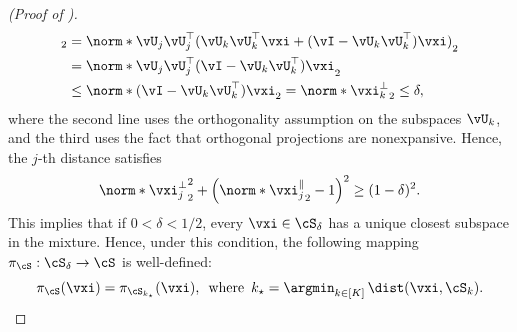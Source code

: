 \documentclass[../../book-main.tex]{subfiles}
\begin{document}
\begin{proof}[(Proof of )]
\begin{align}
{        }_2
        &=
        \norm*{
            \vU_j \vU_j^\top( \vU_k \vU_k^\top \vxi + (\vI - \vU_k \vU_k^\top)
            \vxi )
        }_2
        \\
        &=
        \norm*{
            \vU_j \vU_j^\top (\vI - \vU_k \vU_k^\top) \vxi
        }_2
        \\
        &\leq
        \norm*{
            (\vI - \vU_k \vU_k^\top) \vxi
        }_2
        =
        \norm*{
            \vxi_k^{\perp}
        }_2
        \leq \delta,
    \end{align}
    where the second line uses the orthogonality assumption on the subspaces
    $\vU_k$, and the third uses the fact that orthogonal projections are
    nonexpansive.
    Hence, the $j$-th distance satisfies
    \begin{equation}
        \norm*{\vxi^{\perp}_j}_2^2
        + \left( \norm*{\vxi^{\|}_j}_2 - 1 \right)^2
        \geq
        (1 - \delta)^2.
    \end{equation}
    This implies that if $0 < \delta < 1/2$, every $\vxi \in \cS_{\delta}$ has
    a unique closest subspace in the mixture.
    Hence, under this condition, the following mapping $\pi_{\cS} : \cS_{\delta}
    \to \cS$ is well-defined:
    \begin{equation}
        \pi_{\cS}(\vxi)
        =
        \pi_{\cS_{k_\star}}(\vxi),
        \enspace\text{where}\enspace
        k_{\star} = \argmin_{k \in [K]}\,
        \dist(\vxi, \cS_{k}).
    \end{equation}


\end{proof}
\end{document}
